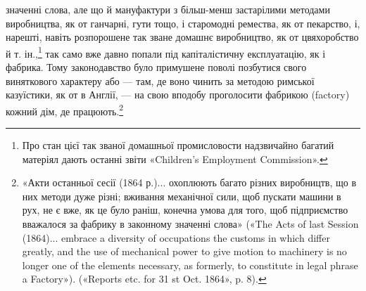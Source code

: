 \parcont{}  %
значенні слова, але що й мануфактури з більш-менш застарілими
методами виробництва, як от ганчарні, гути тощо, і старомодні
ремества, як от пекарство, і, нарешті, навіть розпорошене
так зване домашнє виробництво, як от цвяхоробство й т. ін.,\footnote{
Про стан цієї так званої домашньої промисловости надзвичайно
багатий матеріял дають останні звіти «Children’s Employment Commission».
}
так само вже давно попали під капіталістичну експлуатацію,
як і фабрика. Тому законодавство було примушене поволі
позбутися свого виняткового характеру або — там, де воно чинить
за методою римської казуїстики, як от в Англії, — на свою вподобу
проголосити фабрикою (factory) кожний дім, де працюють.\footnote{
«Акти останньої сесії (1864 р.)... охоплюють багато різних виробництв,
що в них методи дуже різні; вживання механічної сили, щоб пускати
машини в рух, не є вже, як це було раніш, конечна умова для того, щоб
підприємство вважалося за фабрику в законному значенні слова» («The
Acts of last Session (1864)... embrace a diversity of occupations the customs
in which differ greatly, and the use of mechanical power to give motion to
machinery is no longer one of the elements necessary, as formerly, to constitute
in legal phrase a Factory»). («Reports etc. for 31 st Oct. 1864», p. 8).
}

